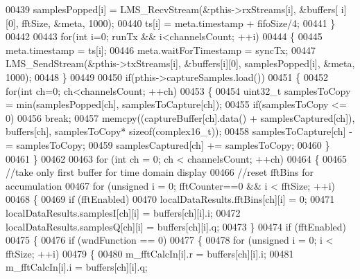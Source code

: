 \begin{DoxyCode}
{{{00439                 samplesPopped[i] = LMS_RecvStream(&pthis->rxStreams[i], &buffers[
      i][0], fftSize, &meta, 1000);
00440                 ts[i] = meta.timestamp + fifoSize/4;
00441             \}
00442 
00443             \textcolor{keywordflow}{for}(\textcolor{keywordtype}{int} i=0; runTx && i<channelsCount; ++i)
00444             \{
00445                 meta.timestamp = ts[i];
00446                 meta.waitForTimestamp = syncTx;
00447                 LMS_SendStream(&pthis->txStreams[i], &buffers[i][0], samplesPopped[i], &meta, 1000);
00448             \}
00449 
00450             \textcolor{keywordflow}{if}(pthis->captureSamples.load())
00451             \{
00452                 \textcolor{keywordflow}{for}(\textcolor{keywordtype}{int} ch=0; ch<channelsCount; ++ch)
00453                 \{
00454                     uint32\_t samplesToCopy = min(samplesPopped[ch], samplesToCapture[ch]);
00455                     \textcolor{keywordflow}{if}(samplesToCopy <= 0)
00456                         \textcolor{keywordflow}{break};
00457                     memcpy((captureBuffer[ch].data() + samplesCaptured[ch]), buffers[ch], samplesToCopy*\textcolor{keyword}{
      sizeof}(complex16_t));
00458                     samplesToCapture[ch] -= samplesToCopy;
00459                     samplesCaptured[ch] += samplesToCopy;
00460                 \}
00461             \}
00462 
00463             \textcolor{keywordflow}{for} (\textcolor{keywordtype}{int} ch = 0; ch < channelsCount; ++ch)
00464             \{
00465                 \textcolor{comment}{//take only first buffer for time domain display}
00466                 \textcolor{comment}{//reset fftBins for accumulation}
00467                 \textcolor{keywordflow}{for} (\textcolor{keywordtype}{unsigned} i = 0; fftCounter==0 && i < fftSize; ++i)
00468                 \{
00469                     \textcolor{keywordflow}{if} (fftEnabled)
00470                         localDataResults.fftBins[ch][i] = 0;
00471                     localDataResults.samplesI[ch][i] = buffers[ch][i].i;
00472                     localDataResults.samplesQ[ch][i] = buffers[ch][i].q;
00473                 \}
00474                 \textcolor{keywordflow}{if} (fftEnabled)
00475                 \{
00476                     \textcolor{keywordflow}{if} (wndFunction == 0)
00477                     \{
00478                         \textcolor{keywordflow}{for} (\textcolor{keywordtype}{unsigned} i = 0; i < fftSize; ++i)
00479                         \{
00480                             m\_fftCalcIn[i].r = buffers[ch][i].i;
00481                             m\_fftCalcIn[i].i = buffers[ch][i].q;
}}}
\end{DoxyCode}
